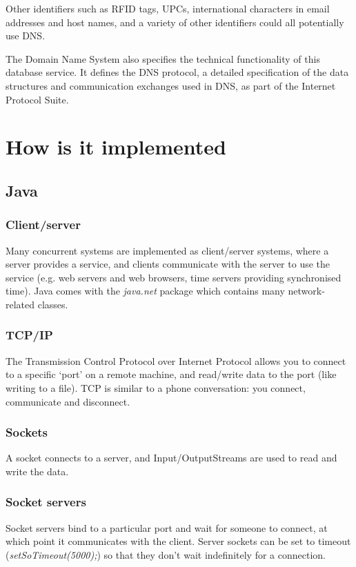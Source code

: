 \documentclass[a4paper,oneside]{report}
\begin{document}
	 Other identifiers such as RFID tags, UPCs, international characters in email addresses and host names, and a variety of other identifiers could all potentially use DNS.

	 The Domain Name System also specifies the technical functionality of this database service. It defines the DNS protocol, a detailed specification of the data structures and communication exchanges used in DNS, as part of the Internet Protocol Suite.

  	\section{How is it implemented}
  	
    	\subsection{Java}
    	
      		\subsubsection{Client/server}
      		Many concurrent systems are implemented as client/server systems, where a server provides a service, and clients communicate with the server to use the service (e.g. web servers and web browsers, time servers providing synchronised time). Java comes with the \emph{java.net} package which contains many network-related classes.
      		
      		\subsubsection{TCP/IP}
      		The Transmission Control Protocol over Internet Protocol allows you to connect to a specific `port' on a remote machine, and read/write data to the port (like writing to a file). TCP is similar to a phone conversation: you connect, communicate and disconnect.     		
        	\subsubsection{Sockets}
        	A socket connects to a server, and Input/OutputStreams are used to read and write the data.
        	
        	\subsubsection{Socket servers}
        	Socket servers bind to a particular port and wait for someone to connect, at which point it communicates with the client. Server sockets can be set to timeout (\emph{setSoTimeout(5000);}) so that they don't wait indefinitely for a connection.
        	
\end{document}

